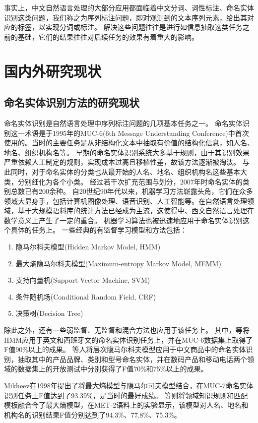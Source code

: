 事实上，中文自然语言处理的大部分应用都面临着中文分词、词性标注、命名实体识别这类问题，我们称之为序列标注问题，即对观测到的文本序列元素，给出其对应的标签，以实现分词或标注。
解决这些问题往往是进行如信息抽取这类任务之前的基础，它们的结果往往对后续任务的效果有着重大的影响。

\section{国内外研究现状}
\label{sec:current}
\subsection{命名实体识别方法的研究现状}
命名实体识别是自然语言处理中序列标注问题的几项基本任务之一。
命名实体识别这一术语是于1995年的MUC-6(6th Message Understanding Conference)中首次使用的。当时的主要任务是从非结构化文本中抽取有价值的结构化信息，如人名、地名、组织机构名等。
早期的命名实体识别系统大多基于规则，由于其识别效果严重依赖人工制定的规则，实现成本过高且移植性差，故该方法逐渐被淘汰。
与此同时，对于命名实体的分类也从最开始的人名、地名、组织机构名这些基本大类，分别细化为各个小类。
经过若干次扩充范围与划分，2007年时命名实体的类别总数已有200余种。
自20世纪90年代以来，机器学习方法崭露头角，它们在众多领域大显身手，包括计算机图像处理、语音识别、人工智能等。在自然语言处理领域，基于大规模语料库的统计方法已经成为主流，这使得中、西文自然语言处理在数学意义上产生了一定的重合。
机器学习算法也被迅速地应用于命名实体识别这个具体的任务上。
一些经典的有监督学习模型和方法包括：
\begin{enumerate}
    \item 隐马尔科夫模型(Hidden Markov Model, HMM)
    \item 最大熵隐马尔科夫模型(Maximum-entropy Markov Model, MEMM)
    \item 支持向量机(Support Vector Machine, SVM)
    \item 条件随机场(Conditional Random Field, CRF)
    \item 决策树(Decision Tree)
\end{enumerate}
除此之外，还有一些弱监督、无监督和混合方法也应用于该任务上。
其中，\citet{bikel1997nymble}等将HMM应用于英文和西班牙文的命名实体识别任务上，并在MUC-6数据集上取得了F值90\%以上的成果。
\citet{liu2005product}等人将层次隐马尔科夫模型应用于中文商品中的命名实体识别，抽取其中的产品品牌、类别和型号命名实体，并在数码产品和移动电话两个领域的数据集上的开放测试中分别获得了F值70\%和75\%以上的成果。

Mikheev\citep{mikheev1998description}在1998年提出了将最大熵模型与隐马尔可夫模型结合，在MUC-7命名实体识别任务上F值达到了93.39\%，是当时的最好成绩。
\citet{tsai2004mencius}等则将领域知识规则和匹配模板融合今了最大熵模型，在MET-2语料上的实验显示，该模型对人名、地名和机构名的识别结果F值分别达到了94.3\%、77.8\%、75.3\%。

